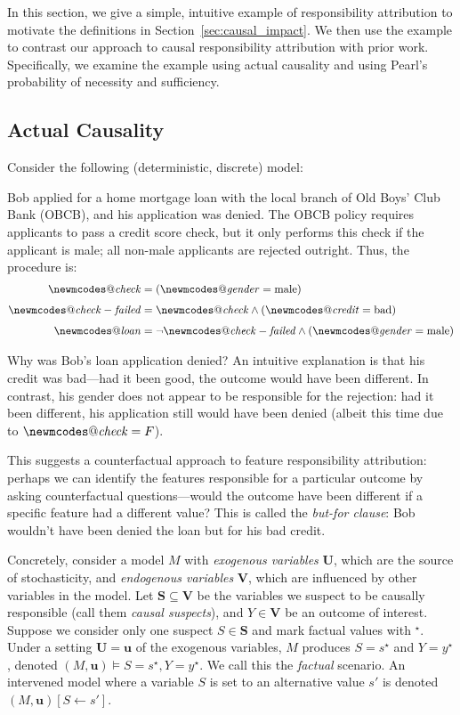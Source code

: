 \documentclass[anon,12pt]{clear2026} %
\makeatletter
\DeclareRobustCommand{\varname}[1]{\begingroup\newmcodes@\mathit{#1}\endgroup}
\makeatother
\begin{document}
In this section, we give a simple, intuitive example of responsibility attribution to motivate the definitions in Section~\ref{sec:causal_impact}.
We then use the example to contrast our approach to causal responsibility attribution with prior work.
Specifically, we examine the example using actual causality and using Pearl's probability of necessity and sufficiency.

\subsection{Actual Causality}

Consider the following (deterministic, discrete) model:

\begin{example}
Bob applied for a home mortgage loan with the local branch of Old Boys’ Club Bank (OBCB), and his application was denied.
The OBCB policy requires applicants to pass a credit score check, but it only performs this check if the applicant is male; all non-male applicants are rejected outright. \label{ex:obcb} Thus, the procedure is:
\begin{align*}
\varname{check} &= (\varname{gender} = \text{male}) \\[4pt]
\varname{check-failed} &= \varname{check} \land (\varname{credit} = \text{bad}) \\[4pt]
\varname{loan} &= \lnot \varname{check-failed} \land (\varname{gender} = \text{male})
\end{align*}
\end{example}

\noindent Why was Bob’s loan application denied?
An intuitive explanation is that his credit was bad---had it been good, the outcome would have been different.
In contrast, his gender does not appear to be responsible for the rejection: had it been different,
his application still would have been denied (albeit this time due to $\varname{check}=F$).

This suggests a counterfactual approach to feature responsibility attribution: perhaps we can identify the features responsible for a particular outcome by asking counterfactual questions---would the outcome have been different if a specific feature had a different value? 
This is called the \textit{but-for clause}: Bob wouldn’t have been denied the loan but for his bad credit.

Concretely, consider a model $M$ with \emph{exogenous variables} $\mathbf{U}$, which are the source of stochasticity, and \emph{endogenous variables} $\mathbf{V}$,  which are influenced by other variables in the model. 
Let $\mathbf{S} \subseteq \mathbf{V}$ be the variables we suspect to be causally responsible (call them \emph{causal suspects}), and 
$Y \in  \mathbf{V}$ be an outcome of interest. 
Suppose we consider only one suspect $S \in \mathbf{S}$ and mark factual values with $^\star$. 
Under a setting $\mathbf{U} = \mathbf{u}$ of the exogenous variables, $M$ produces $S = s^\star$ and $Y = y^\star$, denoted $(M, \mathbf{u}) \models S=s^\star, Y=y^\star$.
We call this the \emph{factual} scenario.
An intervened model where a variable $S$ is set to an alternative value $s'$ is denoted $(M, \mathbf{u})[S \leftarrow s']$.
\end{document}
